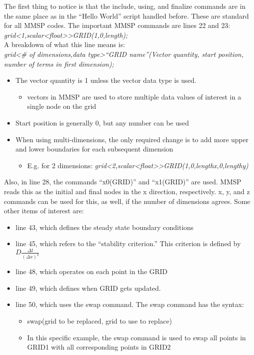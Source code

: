 \documentclass[10pt]{article}
\begin{document}
The first thing to notice is that the include, using, and finalize commands are in the same place as in the “Hello World” script handled before.  These are standard for all MMSP codes.  The important MMSP commands are lines 22 and 23:
\\ 	\textit{grid\textless 1,scalar\textless float\textgreater \textgreater GRID(1,0,length);}
\\A breakdown of what this line means is:
\\ 	\textit{grid\textless \# of dimensions,data type\textgreater “GRID name”(Vector quantity, start position, number of terms in first dimension);}
\\ \begin{itemize} \itemsep1pt \parskip0pt 
\item The vector quantity is 1 unless the vector data type is used.
\begin{itemize} \itemsep1pt \parskip0pt 
\item vectors in MMSP are used to store multiple data values of interest in a single node on the grid
\end{itemize}
\item Start position is generally 0, but any number can be used
\item When using multi-dimensions, the only required change is to add more upper and lower boundaries for each subsequent dimension
\begin{itemize} \itemsep1pt \parskip0pt 
\item E.g. for 2 dimensions: \textit{grid\textless 2,scalar\textless float\textgreater \textgreater GRID(1,0,lengthx,0,lengthy)}
\end{itemize}
\end{itemize}
Also, in line 28, the commands “x0(GRID)” and “x1(GRID)” are used. MMSP reads this as the initial and final nodes in the x direction, respectively. x, y, and z commands can be used for this, as well, if the number of dimensions agrees.
Some other items of interest are:
\begin{itemize} \itemsep1pt \parskip0pt 
\item line 43, which defines the steady state boundary conditions
\item line 45, which refers to the “stability criterion.” This criterion is defined by $D\frac{\Delta t}{(\Delta x)^2}$
\item line 48, which operates on each point in the GRID
\item line 49, which defines when GRID gets updated.
\item line 50, which uses the swap command. The swap command has the syntax:
\begin{itemize} \itemsep1pt \parskip0pt 
\item swap(grid to be replaced, grid to use to replace)
\item In this specific example, the swap command is used to swap all points in GRID1 with all corresponding points in GRID2
\end{itemize}
\end{itemize}
\end{document}
